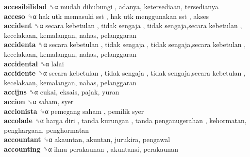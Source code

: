 \textbf{accesibilidad} ␝α   mudah dihubungi , adanya, ketersediaan, tersedianya  \\
\textbf{acceso} ␝α   hak utk memasuki sst ,  hak utk menggunakan sst , akses  \\
\textbf{accident} ␝α   secara kebetulan ,  tidak sengaja ,  tidak sengaja,secara kebetulan , kecelakaan, kemalangan, nahas, pelanggaran  \\
\textbf{accidenta} ␝α   secara kebetulan ,  tidak sengaja ,  tidak sengaja,secara kebetulan , kecelakaan, kemalangan, nahas, pelanggaran  \\
\textbf{accidental} ␝α  lalai  \\
\textbf{accidente} ␝α   secara kebetulan ,  tidak sengaja ,  tidak sengaja,secara kebetulan , kecelakaan, kemalangan, nahas, pelanggaran  \\
\textbf{accijns} ␝α  cukai, eksais, pajak, yuran  \\
\textbf{accion} ␝α  saham, syer  \\
\textbf{accionista} ␝α   pemegang saham ,  pemilik syer   \\
\textbf{accolade} ␝α   harga diri ,  tanda kurungan ,  tanda penganugerahan , kehormatan, penghargaan, penghormatan  \\
\textbf{accountant} ␝α  akauntan, akuntan, jurukira, pengawal  \\
\textbf{accounting} ␝α   ilmu perakaunan , akuntansi, perakaunan  \\
